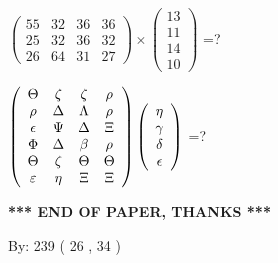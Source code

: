 \documentclass[12pt]{article}
\begin{document}
  
 
$ \left( \begin{array}{ccccccccc}
          55  & 
          32  & 
          36  & 
          36  \\ 
          25  & 
          32  & 
          36  & 
          32  \\ 
          26  & 
          64  & 
          31  & 
          27
\end{array}\right) \times
\left( \begin{array}{c}
          13  \\ 
          11  \\ 
          14  \\ 
          10
\end{array}\right) $ =?
 
 
$  %
 \left( \begin{array}
 {
 c
 c
 c
 c
 }
 \Theta & 
                    \zeta & 
                    \zeta & 
 \rho \\ 
 \rho & 
 \Delta & 
 \Lambda & 
 \rho \\ 
 \epsilon & 
 \Psi & 
 \Delta & 
                    \Xi \\ 
 \Phi & 
 \Delta & 
 \beta & 
 \rho \\ 
 \Theta & 
                    \zeta & 
 \Theta & 
 \Theta \\ 
 \varepsilon & 
 \eta & 
                    \Xi & 
                    \Xi
 \end{array} \right)
 \left( \begin{array}
 {
 c
 }
 \eta \\ 
 \gamma \\ 
 \delta \\ 
 \epsilon
 \end{array} \right)
$ =?
 

 

 
\vspace{0.3in}
   
   
 \vspace{0.2in}
 
   
   
   
   
\vspace{1.0in} 
{\textbf{\large{ *** END OF PAPER, THANKS *** }}} 
   
   
\hspace{1.0in} By: 
         239 (          26 ,           34 )
   
   
   
\end{document}
